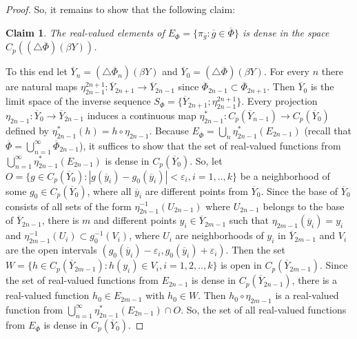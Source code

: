 \documentclass[12pt]{amsart}
\newtheorem{claim}{Claim}
\begin{document}
\begin{proof}
So, it remains to show that the following claim:
\begin{claim}
The real-valued elements of $E_{\overline\Phi}=\{\pi_{\overline g}: \overline g\in\overline\Phi\}$ is dense in the space $C_p((\triangle\overline\Phi)(\beta Y))$. 
\end{claim}
To this end let $\overline Y_n=(\triangle\overline\Phi_n)(\beta Y)$ and $\overline Y_0=(\triangle\overline\Phi)(\beta Y)$. For every $n$ there are natural maps $\eta^{2n+1}_{2n-1}:\overline Y_{2n+1}\to \overline Y_{2n-1}$ since $\overline\Phi_{2n-1}\subset\overline\Phi_{2n+1}$. Then 
$\overline Y_0$ is the limit space of the inverse sequence $S_\Phi=\{\overline Y_{2n+1};\eta^{2n+1}_{2n-1}\}$.
Every projection $\eta_{2n-1}:\overline Y_0\to\overline Y_{2n-1}$ induces a continuous map 
$\eta_{2n-1}^*:C_p(\overline Y_{n-1})\to C_p(\overline Y_0)$ defined by $\eta_{2n-1}^*(h)=h\circ\eta_{2n-1}$. 
Because 
$E_{\overline\Phi}=\bigcup_n\eta_{2n-1}^*(E_{2n-1})$ (recall that $\overline\Phi=\bigcup_{n=1}^\infty\overline\Phi_{2n-1}$), it suffices to show that  
the set of real-valued functions from $\bigcup_{n=1}^\infty\eta_{2n-1}^*(E_{2n-1})$ is dense in $C_p(\overline Y_0)$. So, let 
$O=\{g\in C_p(\overline Y_0):|g(\overline y_i)-g_0(\overline y_i)|<\varepsilon_i, i=1,..,k\}$ be a neighborhood of some $g_0\in C_p(\overline Y_0)$, where 
all $\overline y_i$ are different points from $\overline Y_0$. Since the base of $\overline Y_0$ consists of all sets of the form $\eta_{2n-1}^{-1}(U_{2n-1})$ where $U_{2n-1}$ belongs to the base of $\overline Y_{2n-1}$, there is $m$ and different points $y_i\in\overline Y_{2m-1}$ such that $\eta_{2m-1}(\overline y_i)=y_i$ and $\eta_{2m-1}^{-1}(U_i)\subset g_0^{-1}(V_i)$, where $U_i$ are neighborhoods of $y_i$ in $\overline Y_{2m-1}$ and $V_i$ are the open intervals $(g_0(\overline y_i)-\varepsilon_i,g_0(\overline y_i)+\varepsilon_i)$. Then the set $W=\{h\in C_p(\overline Y_{2m-1}):h(y_i)\in V_i, i=1,2,..,k\}$  is open in $C_p(\overline Y_{2m-1})$. Since the set of real-valued functions from $E_{2n-1}$ is dense in $C_p(\overline Y_{2n-1})$, there is a real-valued function
$h_0\in E_{2m-1}$ with $h_0\in W$. Then $h_0\circ\eta_{2m-1}$ is a real-valued function from $\bigcup_{n=1}^\infty\eta_{2n-1}^*(E_{2n-1})\cap O$. So, the set of all real-valued functions from $E_{\overline\Phi}$ is dense in $C_p(\overline Y_0)$.
\end{proof}
\end{document}
